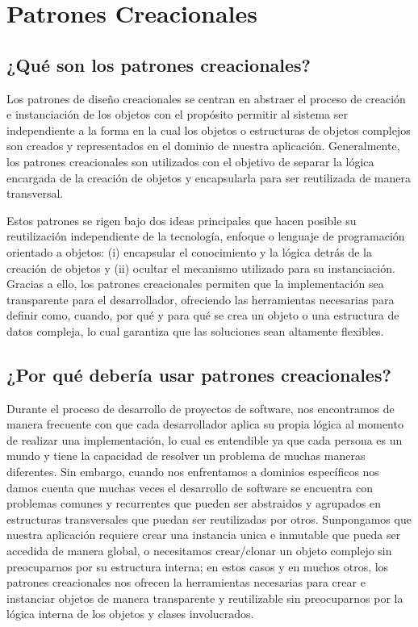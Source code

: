 

\setchapterpreamble[u]{\margintoc}
\chapter{Patrones Creacionales}

\section{{¿Qué son los patrones creacionales?}}

Los patrones de diseño creacionales se centran en abstraer el proceso de creación e instanciación de los objetos con el propósito permitir al sistema ser independiente a la forma en la cual los objetos o estructuras de objetos complejos son creados y representados en el dominio de nuestra aplicación. Generalmente, los patrones creacionales son utilizados con el objetivo de separar la lógica encargada de la creación de objetos y encapsularla para ser reutilizada de manera transversal.

Estos patrones se rigen bajo dos ideas principales que hacen posible su reutilización independiente de la tecnología, enfoque o lenguaje de programación orientado a objetos: (i) encapsular el conocimiento y la lógica detrás de la creación de objetos y (ii) ocultar el mecanismo utilizado para su instanciación. Gracias a ello, los patrones creacionales permiten que la implementación sea transparente para el desarrollador, ofreciendo las herramientas necesarias para definir como, cuando, por qué y para qué se crea un objeto o una estructura de datos compleja, lo cual garantiza que las soluciones sean altamente flexibles.

\section{¿Por qué debería usar patrones creacionales?}

Durante el proceso de desarrollo de proyectos de software, nos encontramos de manera frecuente con que cada desarrollador aplica su propia lógica al momento de realizar una implementación, lo cual es entendible ya que cada persona es un mundo y tiene la capacidad de resolver un problema de muchas maneras diferentes. Sin embargo, cuando nos enfrentamos a dominios específicos nos damos cuenta que muchas veces el desarrollo de software se encuentra con problemas comunes y recurrentes que pueden ser abstraidos y agrupados en estructuras transversales que puedan ser reutilizadas por otros. Sunpongamos que nuestra aplicación requiere crear una instancia unica e inmutable que pueda ser accedida de manera global, o necesitamos crear/clonar un objeto complejo sin preocuparnos por su estructura interna; en estos casos y en muchos otros, los patrones creacionales nos ofrecen la herramientas necesarias para crear e instanciar objetos de manera transparente y reutilizable sin preocuparnos por la lógica interna de los objetos y clases involucrados.

